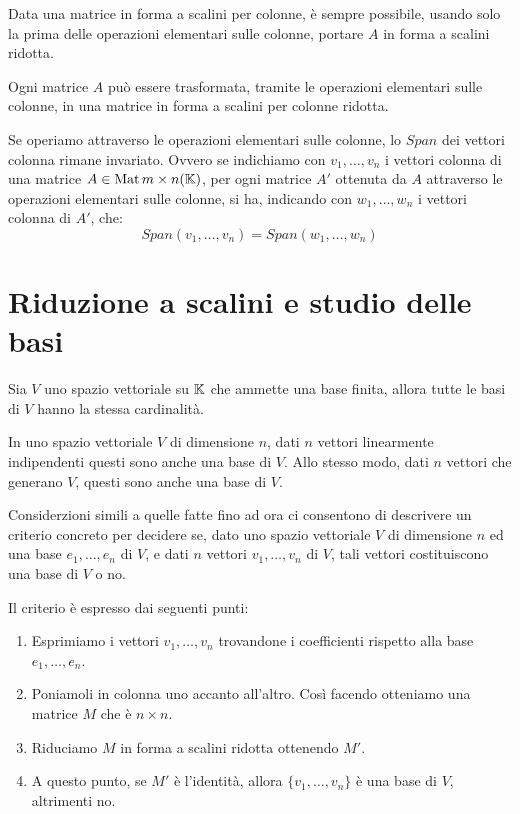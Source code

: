 \begin{proposition}
	Data una matrice in forma a scalini per colonne, è sempre possibile, usando
	solo la prima delle operazioni elementari sulle colonne, portare $A$ in forma
	a scalini ridotta.
\end{proposition}

\begin{corollary}
	Ogni matrice $A$ può essere trasformata, tramite le operazioni elementari
	sulle colonne, in una matrice in forma a scalini per colonne ridotta.
\end{corollary}

\begin{proposition}
	Se operiamo attraverso le operazioni elementari sulle colonne, lo
	$Span$ dei vettori colonna rimane invariato. Ovvero se indichiamo con
	$v_1, \dots, v_n$ i vettori colonna di una matrice
	$A \in \operatorname{Mat}{m \times n}(\mathbb{K})$, per ogni matrice $A'$ ottenuta da $A$
	attraverso le operazioni elementari sulle colonne, si ha, indicando con
	$w_1, \dots, w_n$ i vettori colonna di $A'$, che:
	\[
		Span(v_1, \dots, v_n) = Span(w_1, \dots, w_n)
	\]
\end{proposition}

\section{Riduzione a scalini e studio delle basi}

\begin{theorem}
	Sia $V$ uno spazio vettoriale su $\mathbb{K}$ che ammette una base
	finita, allora tutte le basi di $V$ hanno la stessa cardinalità.
\end{theorem}

\begin{corollary}
	In uno spazio vettoriale $V$ di dimensione $n$, dati $n$ vettori
	linearmente indipendenti questi sono anche una base di $V$. Allo
	stesso modo, dati $n$ vettori che generano $V$, questi sono anche una
	base di $V$.
\end{corollary}

Considerzioni simili a quelle fatte fino ad ora ci consentono di descrivere
un criterio concreto per decidere se, dato uno spazio vettoriale $V$ di
dimensione $n$ ed una base $e_1, \dots, e_n$ di $V$, e dati $n$ vettori
$v_1, \dots, v_n$ di $V$, tali vettori costituiscono una base di $V$ o no.

Il criterio è espresso dai seguenti punti:
\begin{enumerate}
	\item Esprimiamo i vettori $v_1, \dots, v_n$ trovandone i coefficienti rispetto
	      alla base $e_1, \dots, e_n$.
	\item Poniamoli in colonna uno accanto all'altro. Così facendo otteniamo una
	      matrice $M$ che è $n \times n$.
	\item Riduciamo $M$ in forma a scalini ridotta ottenendo $M'$.
	\item A questo punto, se $M'$ è l'identità, allora $\{v_1, \dots, v_n\}$
	      è una base di $V$, altrimenti no.
\end{enumerate}

